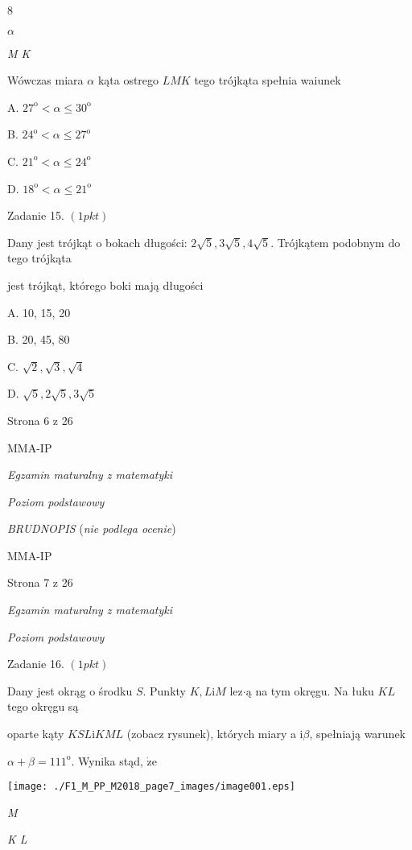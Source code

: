 \documentclass[a4paper,12pt]{article}
\begin{document}
8

$\alpha$

{\it M  K}

Wówczas miara $\alpha$ kąta ostrego $LMK$ tego trójkąta spełnia waiunek

A. $27^{\mathrm{o}}<\alpha\leq 30^{\mathrm{o}}$

B. $24^{\mathrm{o}}<\alpha\leq 27^{\mathrm{o}}$

C. $21^{\mathrm{o}}<\alpha\leq 24^{\mathrm{o}}$

D. $18^{\mathrm{o}}<\alpha\leq 21^{\mathrm{o}}$

Zadanie 15. $(1pkt)$

Dany jest trójkąt o bokach długości: $2\sqrt{5}, 3\sqrt{5}, 4\sqrt{5}$. Trójkątem podobnym do tego trójkąta

jest trójkąt, którego boki mają długości

A. 10, 15, 20

B. 20, 45, 80

C. $\sqrt{2}, \sqrt{3}, \sqrt{4}$

D. $\sqrt{5}, 2\sqrt{5}, 3\sqrt{5}$

Strona 6 z 26

MMA-IP





{\it Egzamin maturalny z matematyki}

{\it Poziom podstawowy}

{\it BRUDNOPIS} ({\it nie podlega ocenie})

MMA-IP

Strona 7 z 26





{\it Egzamin maturalny z matematyki}

{\it Poziom podstawowy}

Zadanie 16. $(1pkt)$

Dany jest okrąg o środku $S$. Punkty $K, L\mathrm{i}M$ lez$\cdot$ą na tym okręgu. Na łuku $KL$ tego okręgu są

oparte kąty $KSL \mathrm{i} KML$ (zobacz rysunek), których miary a $\mathrm{i} \beta$, spełniają warunek

$\alpha+\beta=111^{\mathrm{o}}$. Wynika stąd, $\dot{\mathrm{z}}\mathrm{e}$
\begin{center}
\texttt{[image: ./F1\_M\_PP\_M2018\_page7\_images/image001.eps]}
\end{center}
{\it M}

{\it K  L}
\end{document}
